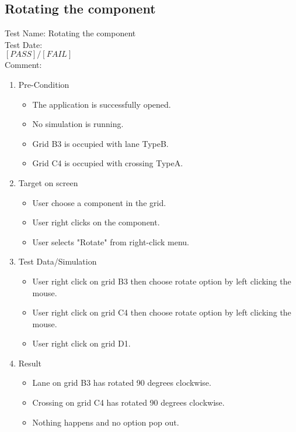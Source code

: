 \newpage

\subsection{Rotating the component}
Test Name: Rotating the component\\Test Date: \\ $\left[ PASS \right] / \left[ FAIL \right]$\\Comment: \\
\begin{enumerate}
	\item Pre-Condition
	\begin{itemize}
		\item The application is successfully opened.
		\item No simulation is running.
		\item Grid B3 is occupied with lane TypeB.
		\item Grid C4 is occupied with crossing TypeA.
	\end{itemize}
	\item Target on screen
	\begin{itemize}
		\item User choose a component in the grid.
		\item User right clicks on the component.
		\item User selects "Rotate" from right-click menu.
	\end{itemize}
	\item Test Data/Simulation
	\begin{itemize}
		\item User right click on grid B3 then choose rotate option by left clicking the mouse. 
		\item User right click on grid C4 then choose rotate option by left clicking the mouse.
		\item User right click on grid D1. 
	\end{itemize}
	\item Result
	\begin{itemize}
		\item Lane on grid B3 has rotated 90 degrees clockwise.
		\item Crossing on grid C4 has rotated 90 degrees clockwise.
		\item Nothing happens and no option pop out.
	\end{itemize}
\end{enumerate}

\newpage

